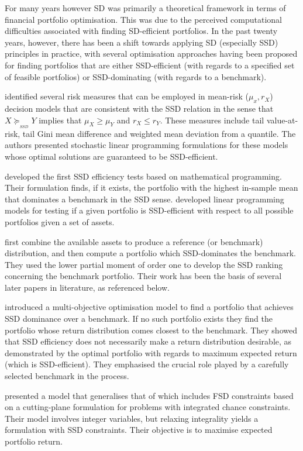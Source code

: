 For many years however SD was primarily a theoretical framework in terms of financial portfolio optimisation. This was
 due to the perceived computational difficulties associated with finding SD-efficient portfolios. In the past twenty years, however, there has been a shift towards applying SD (especially SSD) principles in practice, with several optimisation approaches having been proposed for finding portfolios that are either SSD-efficient (with regards to a
specified set of feasible portfolios) or SSD-dominating (with regards to a benchmark).

\cite{ogryczak2002} identified several risk measures that can be employed in mean-risk ($\mu_x, r_X$) decision models that are consistent with the SSD relation in the sense that $X \succeq_{_{SSD}} Y$ implies that $\mu_X \geq \mu_Y$ and $r_X \leq r_Y$. These measures include tail value-at-risk, tail Gini mean difference and weighted mean deviation from a quantile. The authors presented stochastic linear programming formulations for these models whose optimal solutions are guaranteed to be SSD-efficient.

 \cite{kuosmanen2004, kuosmanen2001}
developed the first SSD efficiency tests based on mathematical programming. Their formulation finds, if it exists,  
the portfolio with the highest in-sample mean that dominates a benchmark in the SSD sense.
\cite{post2003} developed linear programming models for testing if a given portfolio is SSD-efficient with respect to all possible portfolios given a set of assets. 

\cite{dentcheva2006, dentcheva2003} first combine the available assets to produce a reference (or benchmark) distribution, and then compute a portfolio which SSD-dominates the benchmark. They used the lower partial moment of order one to develop the SSD ranking concerning the benchmark portfolio. Their work has been the basis of several later papers in literature, as referenced below.

\cite{roman2006} introduced a multi-objective optimisation model to find a portfolio that achieves SSD dominance over a benchmark. If no such portfolio exists they find the portfolio whose return distribution comes closest to the benchmark. They showed that SSD efficiency does not necessarily make a return distribution desirable, as demonstrated by the optimal portfolio with regards to maximum expected return (which is SSD-efficient). They emphasised the crucial role played by a carefully selected benchmark in the process.

\cite{luedtke2008} presented a model that generalises that of \cite{kuosmanen2004} which includes FSD constraints based on a cutting-plane formulation for problems with integrated chance constraints. Their model involves integer variables, but relaxing integrality yields a formulation with SSD constraints. Their objective is to maximise expected portfolio return.

